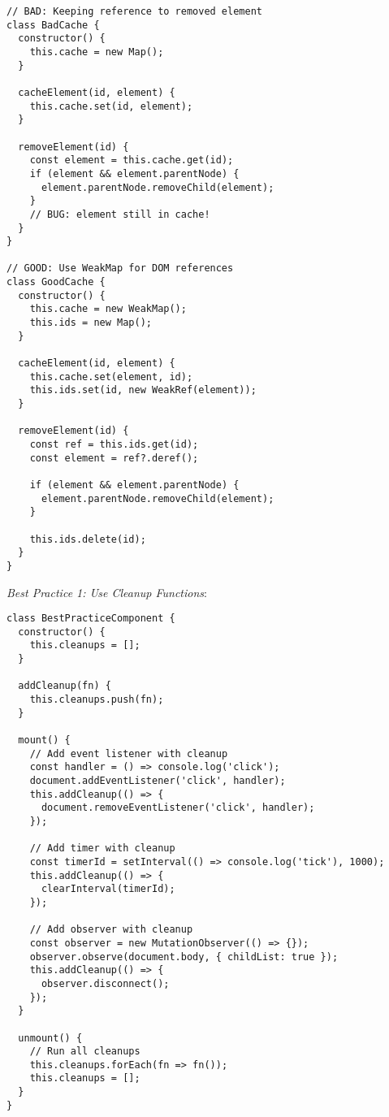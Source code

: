 \documentclass[11pt]{article}
\begin{document}
\begin{verbatim}
// BAD: Keeping reference to removed element
class BadCache {
  constructor() {
    this.cache = new Map();
  }
  
  cacheElement(id, element) {
    this.cache.set(id, element);
  }
  
  removeElement(id) {
    const element = this.cache.get(id);
    if (element && element.parentNode) {
      element.parentNode.removeChild(element);
    }
    // BUG: element still in cache!
  }
}

// GOOD: Use WeakMap for DOM references
class GoodCache {
  constructor() {
    this.cache = new WeakMap();
    this.ids = new Map();
  }
  
  cacheElement(id, element) {
    this.cache.set(element, id);
    this.ids.set(id, new WeakRef(element));
  }
  
  removeElement(id) {
    const ref = this.ids.get(id);
    const element = ref?.deref();
    
    if (element && element.parentNode) {
      element.parentNode.removeChild(element);
    }
    
    this.ids.delete(id);
  }
}
\end{verbatim}

\emph{Best Practice 1: Use Cleanup Functions}:

\begin{verbatim}
class BestPracticeComponent {
  constructor() {
    this.cleanups = [];
  }
  
  addCleanup(fn) {
    this.cleanups.push(fn);
  }
  
  mount() {
    // Add event listener with cleanup
    const handler = () => console.log('click');
    document.addEventListener('click', handler);
    this.addCleanup(() => {
      document.removeEventListener('click', handler);
    });
    
    // Add timer with cleanup
    const timerId = setInterval(() => console.log('tick'), 1000);
    this.addCleanup(() => {
      clearInterval(timerId);
    });
    
    // Add observer with cleanup
    const observer = new MutationObserver(() => {});
    observer.observe(document.body, { childList: true });
    this.addCleanup(() => {
      observer.disconnect();
    });
  }
  
  unmount() {
    // Run all cleanups
    this.cleanups.forEach(fn => fn());
    this.cleanups = [];
  }
}
\end{verbatim}
\end{document}
